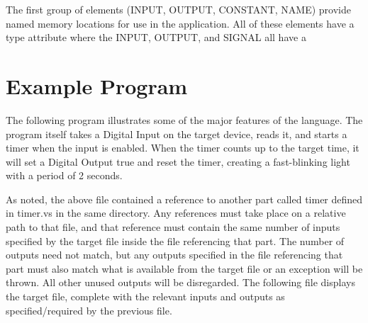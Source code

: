 \documentclass[dvips,12pt]{article}
\newcommand{\includecode}[1]{}
\begin{document}
The first group of elements (INPUT, OUTPUT, CONSTANT, NAME) provide named
memory locations for use in the application. All of these elements have a
type attribute where the INPUT, OUTPUT, and SIGNAL all have a 

\section{Example Program}

The following program illustrates some of the major features of the language. The
program itself takes a Digital Input on the target device, reads it, and starts a
timer when the input is enabled. When the timer counts up to the target time, it
will set a Digital Output true and reset the timer, creating a fast-blinking light
with a period of 2 seconds.

\includecode{../example/timed-blinking-light/timed-blinking-light.vs}

As noted, the above file contained a reference to another part called timer defined
in timer.vs in the same directory. Any references must take place on a relative path
to that file, and that reference must contain the same number of inputs specified by
the target file inside the file referencing that part. The number of outputs need
not match, but any outputs specified in the file referencing that part must also
match what is available from the target file or an exception will be thrown. All
other unused outputs will be disregarded. The following file displays the target
file, complete with the relevant inputs and outputs as specified/required by the
previous file.

\includecode{../example/timed-blinking-light/timer.vs}
\end{document}
